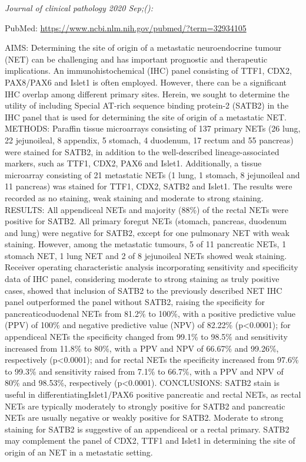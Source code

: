 \documentclass[
]{article}
\begin{document}
\emph{Journal of clinical pathology 2020 Sep;():}

PubMed: \url{https://www.ncbi.nlm.nih.gov/pubmed/?term=32934105}

AIMS: Determining the site of origin of a metastatic neuroendocrine
tumour (NET) can be challenging and has important prognostic and
therapeutic implications. An immunohistochemical (IHC) panel consisting
of TTF1, CDX2, PAX8/PAX6 and Islet1 is often employed. However, there
can be a significant IHC overlap among different primary sites. Herein,
we sought to determine the utility of including Special AT-rich sequence
binding protein-2 (SATB2) in the IHC panel that is used for determining
the site of origin of a metastatic NET. METHODS: Paraffin tissue
microarrays consisting of 137 primary NETs (26 lung, 22 jejunoileal, 8
appendix, 5 stomach, 4 duodenum, 17 rectum and 55 pancreas) were stained
for SATB2, in addition to the well-described lineage-associated markers,
such as TTF1, CDX2, PAX6 and Islet1. Additionally, a tissue microarray
consisting of 21 metastatic NETs (1 lung, 1 stomach, 8 jejunoileal and
11 pancreas) was stained for TTF1, CDX2, SATB2 and Islet1. The results
were recorded as no staining, weak staining and moderate to strong
staining. RESULTS: All appendiceal NETs and majority (88\%) of the
rectal NETs were positive for SATB2. All primary foregut NETs (stomach,
pancreas, duodenum and lung) were negative for SATB2, except for one
pulmonary NET with weak staining. However, among the metastatic tumours,
5 of 11 pancreatic NETs, 1 stomach NET, 1 lung NET and 2 of 8
jejunoileal NETs showed weak staining. Receiver operating characteristic
analysis incorporating sensitivity and specificity data of IHC panel,
considering moderate to strong staining as truly positive cases, showed
that inclusion of SATB2 to the previously described NET IHC panel
outperformed the panel without SATB2, raising the specificity for
pancreaticoduodenal NETs from 81.2\% to 100\%, with a positive
predictive value (PPV) of 100\% and negative predictive value (NPV) of
82.22\% (p\textless0.0001); for appendiceal NETs the specificity changed
from 99.1\% to 98.5\% and sensitivity increased from 11.8\% to 80\%,
with a PPV and NPV of 66.67\% and 99.26\%, respectively
(p\textless0.0001); and for rectal NETs the specificity increased from
97.6\% to 99.3\% and sensitivity raised from 7.1\% to 66.7\%, with a PPV
and NPV of 80\% and 98.53\%, respectively (p\textless0.0001).
CONCLUSIONS: SATB2 stain is useful in differentiatingIslet1/PAX6
positive pancreatic and rectal NETs, as rectal NETs are typically
moderately to strongly positive for SATB2 and pancreatic NETs are
usually negative or weakly positive for SATB2. Moderate to strong
staining for SATB2 is suggestive of an appendiceal or a rectal primary.
SATB2 may complement the panel of CDX2, TTF1 and Islet1 in determining
the site of origin of an NET in a metastatic setting.
\end{document}
